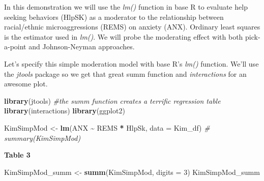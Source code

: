 \documentclass[
  11pt,
]{book}
\newenvironment{Shaded}{\begin{snugshade}}{\end{snugshade}}
\newcommand{\AttributeTok}[1]{\textcolor[rgb]{0.27,0.27,0.27}{#1}}
\newcommand{\CommentTok}[1]{\textcolor[rgb]{0.37,0.37,0.37}{\textit{#1}}}
\newcommand{\DecValTok}[1]{\textcolor[rgb]{0.06,0.06,0.06}{#1}}
\newcommand{\FunctionTok}[1]{\textcolor[rgb]{0.27,0.27,0.27}{\textbf{#1}}}
\newcommand{\NormalTok}[1]{#1}
\newcommand{\OtherTok}[1]{\textcolor[rgb]{0.37,0.37,0.37}{#1}}
\newcommand{\SpecialCharTok}[1]{\textcolor[rgb]{0.43,0.43,0.43}{\textbf{#1}}}
\begin{document}
In this demonstration we will use the \emph{lm()} function in base R to evaluate help seeking behaviors (HlpSK) as a moderator to the relationship between racial/ethnic microaggressions (REMS) on anxiety (ANX). Ordinary least squares is the estimator used in \emph{lm()}. We will probe the moderating effect with both pick-a-point and Johnson-Neyman approaches.

Let's specify this simple moderation model with base R's \emph{lm()} function. We'll use the \emph{jtools} package so we get that great summ function and \emph{interactions} for an awesome plot.

\begin{Shaded}
\begin{Highlighting}[]
\FunctionTok{library}\NormalTok{(jtools)  }\CommentTok{\#the summ function creates a terrific regression table}
\FunctionTok{library}\NormalTok{(interactions)}
\FunctionTok{library}\NormalTok{(ggplot2)}

\NormalTok{KimSimpMod }\OtherTok{\textless{}{-}} \FunctionTok{lm}\NormalTok{(ANX }\SpecialCharTok{\textasciitilde{}}\NormalTok{ REMS }\SpecialCharTok{*}\NormalTok{ HlpSk, }\AttributeTok{data =}\NormalTok{ Kim\_df)}
\CommentTok{\# summary(KimSimpMod)}
\end{Highlighting}
\end{Shaded}

\textbf{Table 3}

\begin{Shaded}
\begin{Highlighting}[]
\NormalTok{KimSimpMod\_summ }\OtherTok{\textless{}{-}} \FunctionTok{summ}\NormalTok{(KimSimpMod, }\AttributeTok{digits =} \DecValTok{3}\NormalTok{)}
\NormalTok{KimSimpMod\_summ}
\end{Highlighting}
\end{Shaded}
\end{document}
